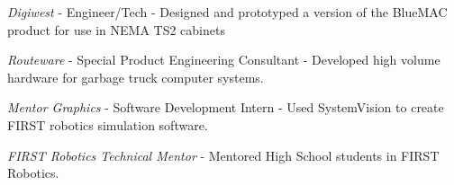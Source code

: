 \documentclass[letterpaper]{deedy-resume} %
\begin{document}
\begin{minipage}[t]{0.66\textwidth}
\vspace{\topsep} %

\begin{tightitemize}
\item \textit{Digiwest} - Engineer/Tech -  Designed and prototyped a version of the BlueMAC product for use in NEMA TS2 cabinets
\item \textit{Routeware} - Special Product Engineering Consultant - Developed high volume hardware for garbage truck computer systems.
\item \textit{Mentor Graphics} - Software Development Intern - Used SystemVision to create FIRST robotics simulation software.
\item \textit{FIRST Robotics Technical Mentor} - Mentored High School students in FIRST Robotics.

\end{tightitemize}

\end{minipage} %








\end{document}
